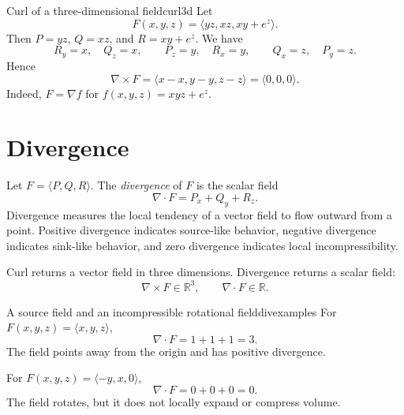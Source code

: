 \documentclass[11pt]{article}
\newcommand{\R}{\mathbb R}
\newcommand{\grad}{\nabla}
\begin{document}
\begin{examplebox}{Curl of a three-dimensional field}{curl3d}
Let
\[
F(x,y,z)=\langle yz,xz,xy+e^z\rangle.
\]
Then $P=yz$, $Q=xz$, and $R=xy+e^z$. We have
\[
R_y=x,\quad Q_z=x,\qquad P_z=y,\quad R_x=y,\qquad Q_x=z,\quad P_y=z.
\]
Hence
\[
\grad\times F=\langle x-x,y-y,z-z\rangle=\langle 0,0,0\rangle.
\]
Indeed, $F=\grad f$ for $f(x,y,z)=xyz+e^z$.
\end{examplebox}

\section{Divergence}

Let $F=\langle P,Q,R\rangle$. The \emph{divergence} of $F$ is the scalar field
\[
\grad\cdot F=P_x+Q_y+R_z.
\]
Divergence measures the local tendency of a vector field to flow outward from a point. Positive divergence indicates source-like behavior, negative divergence indicates sink-like behavior, and zero divergence indicates local incompressibility.

\begin{importantbox}
Curl returns a vector field in three dimensions. Divergence returns a scalar field:
\[
\grad\times F\in\R^3,\qquad \grad\cdot F\in\R.
\]
\end{importantbox}

\begin{examplebox}{A source field and an incompressible rotational field}{divexamples}
For $F(x,y,z)=\langle x,y,z\rangle$,
\[
\grad\cdot F=1+1+1=3.
\]
The field points away from the origin and has positive divergence.

For $F(x,y,z)=\langle -y,x,0\rangle$,
\[
\grad\cdot F=0+0+0=0.
\]
The field rotates, but it does not locally expand or compress volume.
\end{examplebox}
\end{document}
